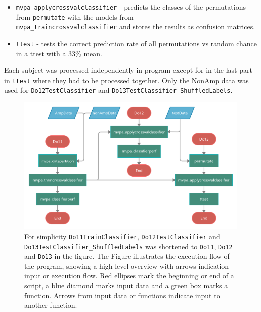 \documentclass[12pt, a4paper]{article}
\begin{document}
\begin{itemize}
\begin{itemize}
        \item \texttt{mvpa\_applycrossvalclassifier} - predicts the classes of the permutations from \texttt{permutate} with the models from \\\texttt{mvpa\_traincrossvalclassifier} and stores the results as confusion matrices.
        
        \item \texttt{ttest} - tests the correct prediction rate of all permutations vs random chance in a ttest with a 33\% mean.
    \end{itemize}
\end{itemize}

Each subject was processed independently in program except for in the last part in \texttt{ttest} where they had to be processed together.
Only the NonAmp data was used for \texttt{Do12TestClassifier} and \texttt{Do13TestClassifier\_ShuffledLabels}.


\begin{figure}[H]
    \centering
    \includegraphics[width=1.0\textwidth, ]{pictures/General structure Master Thesis.png}
    \caption{For simplicity \texttt{Do11TrainClassifier}, \texttt{Do12TestClassifier} and \texttt{Do13TestClassifier\_ShuffledLabels} was shortened to \texttt{Do11}, \texttt{Do12} and \texttt{Do13} in the figure.
    The Figure illustrates the execution flow of the program, showing a high level overview with arrows indication input or execution flow.
    Red ellipses mark the beginning or end of a script, a blue diamond marks input data and a green box marks a function.
    Arrows from input data or functions indicate input to another function.}
    \label{fig:GeneralProgramStructure}
\end{figure}

\end{document}
